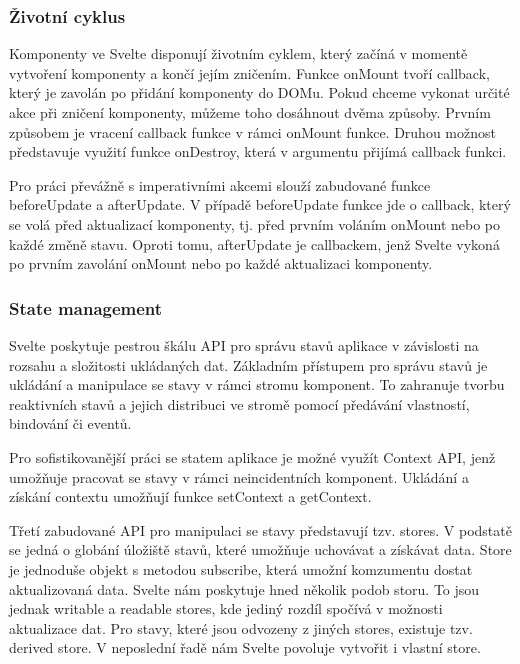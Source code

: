 \subsubsection{Životní cyklus}

Komponenty ve Svelte disponují životním cyklem, který začíná v momentě vytvoření komponenty a končí jejím zničením. 
Funkce onMount tvoří callback, který je zavolán po přidání komponenty do DOMu. Pokud chceme vykonat určité akce při zničení komponenty, můžeme toho dosáhnout dvěma způsoby. 
Prvním způsobem je vracení callback funkce v rámci onMount funkce. Druhou možnost představuje využití funkce onDestroy, která v argumentu přijímá callback funkci. 

Pro práci převážně s imperativními akcemi slouží zabudované funkce beforeUpdate a afterUpdate. 
V případě beforeUpdate funkce jde o callback, který se volá před aktualizací komponenty, tj. před prvním voláním onMount nebo po každé změně stavu. 
Oproti tomu, afterUpdate je callbackem, jenž Svelte vykoná po prvním zavolání onMount nebo po každé aktualizaci komponenty.\cite{sveltehandbook,svelte}

\subsubsection{State management}

Svelte poskytuje pestrou škálu API pro správu stavů aplikace v závislosti na rozsahu a složitosti ukládaných dat. 
Základním přístupem pro správu stavů je ukládání a manipulace se stavy v rámci stromu komponent. 
To zahranuje tvorbu reaktivních stavů a jejich distribuci ve stromě pomocí předávání vlastností, bindování či eventů. 

Pro sofistikovanější práci se statem aplikace je možné využít Context API, jenž umožňuje pracovat se stavy v rámci neincidentních komponent. 
Ukládání a získání contextu umožňují funkce setContext a getContext.

Třetí zabudované API pro manipulaci se stavy představují tzv. stores. V podstatě se jedná o globání úložiště stavů, které umožňuje uchovávat a získávat data. 
Store je jednoduše objekt s metodou subscribe, která umožní komzumentu dostat aktualizovaná data. Svelte nám poskytuje hned několik podob storu. 
To jsou jednak writable a readable stores, kde jediný rozdíl spočívá v možnosti aktualizace dat. Pro stavy, které jsou odvozeny z jiných stores, existuje tzv. derived store. 
V neposlední řadě nám Svelte povoluje vytvořit i vlastní store. 

